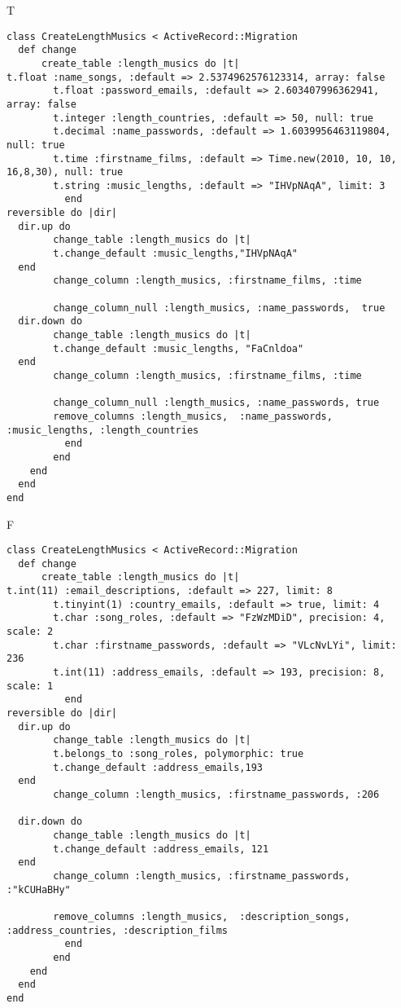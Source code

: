 T
\begin{verbatim}
class CreateLengthMusics < ActiveRecord::Migration
  def change
	  create_table :length_musics do |t|
t.float :name_songs, :default => 2.5374962576123314, array: false
		t.float :password_emails, :default => 2.603407996362941, array: false
		t.integer :length_countries, :default => 50, null: true
		t.decimal :name_passwords, :default => 1.6039956463119804, null: true
		t.time :firstname_films, :default => Time.new(2010, 10, 10, 16,8,30), null: true
		t.string :music_lengths, :default => "IHVpNAqA", limit: 3
		  end
reversible do |dir|
  dir.up do
		change_table :length_musics do |t|
		t.change_default :music_lengths,"IHVpNAqA"
  end
 		change_column :length_musics, :firstname_films, :time
   
		change_column_null :length_musics, :name_passwords,  true
  dir.down do
		change_table :length_musics do |t|
		t.change_default :music_lengths, "FaCnldoa"
  end
 		change_column :length_musics, :firstname_films, :time
   
		change_column_null :length_musics, :name_passwords, true
 		remove_columns :length_musics,  :name_passwords, :music_lengths, :length_countries 
	      end
	    end
    end 
  end
end

\end{verbatim}

F
\begin{verbatim}
class CreateLengthMusics < ActiveRecord::Migration
  def change
	  create_table :length_musics do |t|
t.int(11) :email_descriptions, :default => 227, limit: 8
		t.tinyint(1) :country_emails, :default => true, limit: 4
		t.char :song_roles, :default => "FzWzMDiD", precision: 4, scale: 2
		t.char :firstname_passwords, :default => "VLcNvLYi", limit: 236
		t.int(11) :address_emails, :default => 193, precision: 8, scale: 1
		  end
reversible do |dir|
  dir.up do
		change_table :length_musics do |t|
		t.belongs_to :song_roles, polymorphic: true
 		t.change_default :address_emails,193
  end
 		change_column :length_musics, :firstname_passwords, :206
   
  dir.down do
		change_table :length_musics do |t|
		t.change_default :address_emails, 121
  end
 		change_column :length_musics, :firstname_passwords, :"kCUHaBHy"
   
		remove_columns :length_musics,  :description_songs, :address_countries, :description_films 
	      end
	    end
    end 
  end
end

\end{verbatim}

